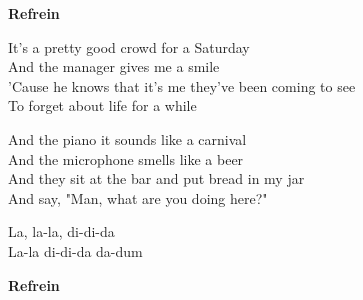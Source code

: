 \textbf{Refrein}

It's a pretty good crowd for a Saturday\\
And the manager gives me a smile\\
'Cause he knows that it's me they've been coming to see\\
To forget about life for a while

And the piano it sounds like a carnival\\
And the microphone smells like a beer\\
And they sit at the bar and put bread in my jar\\
And say, "Man, what are you doing here?"

La, la-la, di-di-da\\
La-la di-di-da da-dum

\textbf{Refrein} 
